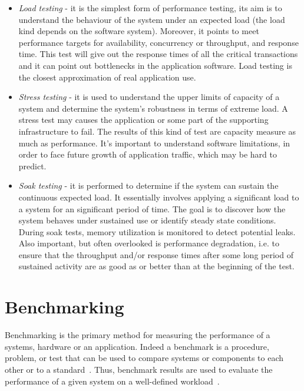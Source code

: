 \begin{itemize}
\item \textit{Load testing} - it is the simplest form of performance testing, its aim is to understand the behaviour of the system under an expected load (the load kind depends on the software system). Moreover, it points to meet performance targets for availability, concurrency or throughput, and response time. This test will give out the response times of all the critical transactions and it can point out bottlenecks in the application software. Load testing is the closest approximation of real application use.

\item \textit{Stress testing} -  it is used to understand the upper limits of capacity of a system and determine the system's robustness in terms of extreme load. A stress test may causes the application or some part of the supporting infrastructure to fail. The results of this kind of test are  capacity measure as much as performance. It's important to understand software limitations, in order to face future growth of application traffic, which may be hard to predict.

\item \textit{Soak testing} - it is performed to determine if the system can sustain the continuous expected load. It essentially involves applying a significant load to a system for an significant period of time. The goal is to discover how the system behaves under sustained use or identify steady state conditions. During soak tests, memory utilization is monitored to detect potential leaks. Also important, but often overlooked is performance degradation, i.e. to ensure that the throughput and/or response times after some long period of sustained activity are as good as or better than at the beginning of the test. 
\end{itemize} 
\pagebreak
\section{Benchmarking}\label{sec:benchmarking}

Benchmarking is the primary method for measuring the performance of a systems, hardware or an application. Indeed a benchmark is a procedure, problem, or test that can be used to compare systems or components to each other or to a standard~\cite{IEEEStd610.12-1990:glossary}. Thus, benchmark results are used to evaluate the performance of a given system on a well-defined workload~\cite{Menasce:2001:CPW:560806}.

